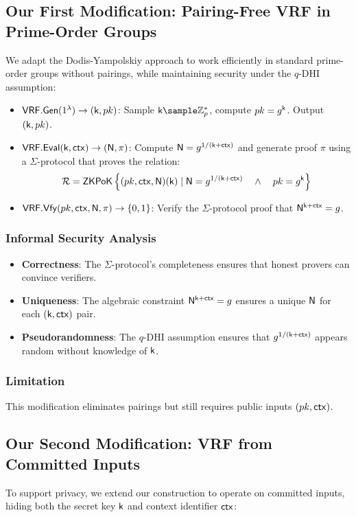 \subsection{Our First Modification: Pairing-Free VRF in Prime-Order Groups}
We adapt the Dodis-Yampolskiy approach to work efficiently in standard prime-order groups without pairings, while maintaining security under the $q$-DHI assumption:

\begin{itemize}
    \item $\mathsf{VRF.Gen}(1^\lambda) \to (\mathsf{k}, pk)$: Sample $\k \sample \mathbb{Z}_p^*$, compute $pk = g^{\mathsf{k}}$. Output $(\mathsf{k}, pk)$.
    \item $\mathsf{VRF.Eval}(\mathsf{k}, \mathsf{ctx}) \to (\mathsf{N}, \pi)$: Compute $\mathsf{N} = g^{1/(\mathsf{k} + \mathsf{ctx})}$ and generate proof $\pi$ using a $\Sigma$-protocol that proves the relation:
    \[
    \mathcal{R} = {\mathsf{ZKPoK}} \left\{(pk, \mathsf{ctx}, \mathsf{N}) (\mathsf{k}) \mid \mathsf{N} = g^{1/(\mathsf{k} + \mathsf{ctx})} \quad \wedge \quad pk = g^{\mathsf{k}}  \right\}
    \]
    \item $\mathsf{VRF.Vfy}(pk, \mathsf{ctx}, \mathsf{N}, \pi) \to \{0,1\}$: Verify the $\Sigma$-protocol proof that $\mathsf{N}^{\mathsf{k}+\mathsf{ctx}} = g$.
\end{itemize}

\subsubsection{Informal Security Analysis}
\begin{itemize}
    \item \textbf{Correctness}: The $\Sigma$-protocol's completeness ensures that honest provers can convince verifiers.
    \item \textbf{Uniqueness}: The algebraic constraint $\mathsf{N}^{\mathsf{k}+\mathsf{ctx}} = g$ ensures a unique $\mathsf{N}$ for each $(\mathsf{k},\mathsf{ctx})$ pair.
    \item \textbf{Pseudorandomness}: The $q$-DHI assumption ensures that $g^{1/(\mathsf{k}+\mathsf{ctx})}$ appears random without knowledge of $\mathsf{k}$.
\end{itemize}

\subsubsection{Limitation}
This modification eliminates pairings but still requires public inputs $(pk, \mathsf{ctx})$.

\subsection{Our Second Modification: VRF from Committed Inputs}
To support privacy, we extend our construction to operate on committed inputs, hiding both the secret key $\mathsf{k}$ and context identifier $\mathsf{ctx}$:

